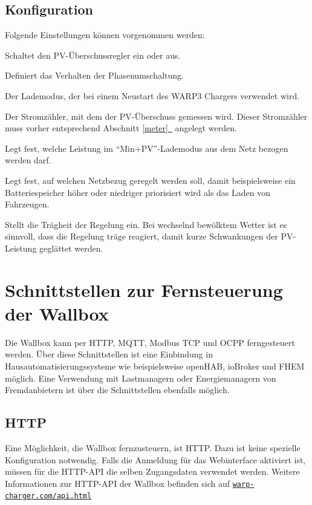 \documentclass[a4paper,10pt]{article}
\newcommand*{\fullref}[1]{Abschnitt \hyperref[{#1}]{\ref*{#1}~\nameref*{#1}}}
\newcommand\rurl[2]{%
  \href{#1}{\nolinkurl{#2}}%
}
\begin{document}
\begin{multicols*}{2}
	\subsection{Konfiguration}
	Folgende Einstellungen können vorgenommen werden:
	\begin{description}[labelindent=0.5cm, leftmargin=0.5cm]
		\item[Überschussladen aktiviert] Schaltet den PV-Über\-schuss\-regler ein oder aus.
		\item[Umschaltungsmodus] Definiert das Verhalten der Phasenumschaltung.
		\item[Standardlademodus] Der Lademodus, der bei einem Neustart des WARP3 Chargers verwendet wird.
		\item[Stromzähler] Der Stromzähler, mit dem der PV-Überschuss gemessen wird. Dieser Stromzähler muss vorher entsprechend \fullref{meter} angelegt werden.
		\item[Min+PV: Mindestladeleistung] Legt fest, welche Leistung im \enquote{Min+PV}-Lademodus aus dem Netz bezogen werden darf.
		\item[Regelverhalten] Legt fest, auf welchen
		Netzbezug geregelt werden soll, damit beispielsweise ein Batteriespeicher höher oder niedriger priorisiert wird als das Laden von Fahrzeugen.
		\item[Wolkenfilter] Stellt die Trägheit der Regelung
		ein. Bei wechselnd bewölktem Wetter ist es sinnvoll, dass die Regelung
		träge reagiert, damit kurze Schwankungen der PV-Leistung geglättet werden.
	\end{description}

    \newpage
    \section{Schnittstellen zur Fernsteuerung der Wallbox}\label{interfaces}
    Die Wallbox kann per HTTP, MQTT, Modbus TCP und OCPP ferngesteuert werden. Über diese Schnittstellen ist eine
    Einbindung in Hausautomatisierungssysteme wie beispielsweise openHAB, ioBroker und FHEM möglich.
    Eine Verwendung mit Lastmanagern oder Energiemanagern von Fremdanbietern
    ist über die Schnittstellen ebenfalls möglich.

    \subsection{HTTP}\label{http-interface}
    Eine Möglichkeit, die Wallbox fernzusteuern, ist HTTP. Dazu ist keine
    spezielle Konfiguration notwendig. Falls die Anmeldung für das Webinterface aktiviert ist, müssen für die HTTP-API die selben Zugangsdaten verwendet werden.
    Weitere Informationen zur HTTP-API der Wallbox befinden sich auf \rurl{https://warp-charger.com/api.html}{warp-charger.com/api.html}



\end{multicols*}
\end{document}
